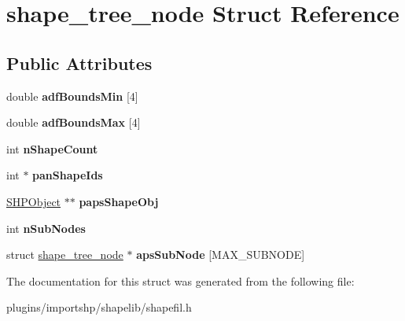 \hypertarget{structshape__tree__node}{\section{shape\-\_\-tree\-\_\-node Struct Reference}
\label{structshape__tree__node}
}
\subsection*{Public Attributes}
\begin{DoxyCompactItemize}
\item 
\hypertarget{structshape__tree__node_aefe58d247ccdbcc728da976d9ff2869d}{double {\bfseries adf\-Bounds\-Min} \mbox{[}4\mbox{]}}\label{structshape__tree__node_aefe58d247ccdbcc728da976d9ff2869d}

\item 
\hypertarget{structshape__tree__node_ad80d8751a6f253570c08b255219e109b}{double {\bfseries adf\-Bounds\-Max} \mbox{[}4\mbox{]}}\label{structshape__tree__node_ad80d8751a6f253570c08b255219e109b}

\item 
\hypertarget{structshape__tree__node_ae45ec6c31bac44b4733fcc61224f434b}{int {\bfseries n\-Shape\-Count}}\label{structshape__tree__node_ae45ec6c31bac44b4733fcc61224f434b}

\item 
\hypertarget{structshape__tree__node_a832c409ef8b06c1517fabeaac26c76c7}{int $\ast$ {\bfseries pan\-Shape\-Ids}}\label{structshape__tree__node_a832c409ef8b06c1517fabeaac26c76c7}

\item 
\hypertarget{structshape__tree__node_a43c73e7089675164c6b1cb8c18b1ee76}{\hyperlink{structSHPObject}{S\-H\-P\-Object} $\ast$$\ast$ {\bfseries paps\-Shape\-Obj}}\label{structshape__tree__node_a43c73e7089675164c6b1cb8c18b1ee76}

\item 
\hypertarget{structshape__tree__node_a6ef486443780c82ca38cb47ac44519e9}{int {\bfseries n\-Sub\-Nodes}}\label{structshape__tree__node_a6ef486443780c82ca38cb47ac44519e9}

\item 
\hypertarget{structshape__tree__node_a8b071eda7d9901e7edb348a36237081b}{struct \hyperlink{structshape__tree__node}{shape\-\_\-tree\-\_\-node} $\ast$ {\bfseries aps\-Sub\-Node} \mbox{[}M\-A\-X\-\_\-\-S\-U\-B\-N\-O\-D\-E\mbox{]}}\label{structshape__tree__node_a8b071eda7d9901e7edb348a36237081b}

\end{DoxyCompactItemize}


The documentation for this struct was generated from the following file\-:\begin{DoxyCompactItemize}
\item 
plugins/importshp/shapelib/shapefil.\-h\end{DoxyCompactItemize}
